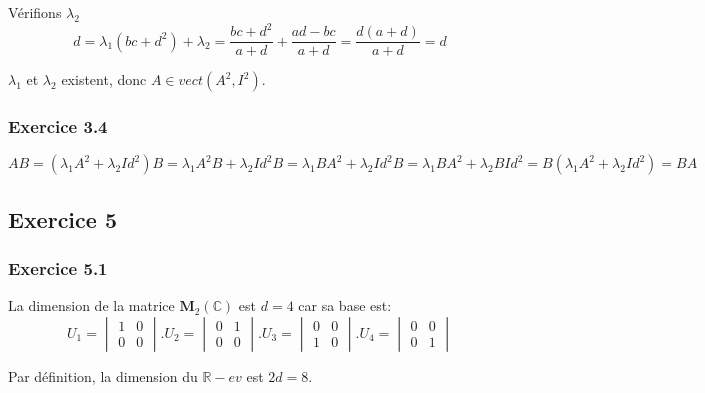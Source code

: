 \documentclass[]{book}
\theoremstyle{definition}
\newcommand{\bb}[1]{\mathbb{#1}}
\newcommand{\R}{\bb{R}}
\newcommand{\C}{\bb{C}}
\newcommand{\M}{\mathbf{M}}
\begin{document}
V\'erifions $\lambda_2$
$$
d = \lambda_1(bc+d^2) + \lambda_2 = \frac{bc+d^2}{a+d} + \frac{ad - bc}{a+d} = \frac{d(a+d)}{a+d} = d
$$

$\lambda_1$ et $\lambda_2$ existent, donc $A \in vect(A^2, I^2)$.

\subsubsection*{Exercice 3.4}
$$
AB = (\lambda_1A^2 + \lambda_2Id^2)B = \lambda_1A^2B + \lambda_2Id^2B = \lambda_1BA^2 + \lambda_2Id^2B = \lambda_1BA^2 + \lambda_2BId^2 = B(\lambda_1A^2 + \lambda_2Id^2) = BA
$$

\subsection*{Exercice 5}
\subsubsection*{Exercice 5.1}
La dimension de la matrice $\M_2(\C)$ est $d=4$ car sa base est:
$$U_1 = \begin{vmatrix} 1 & 0 \\ 0 & 0 \end{vmatrix} . U_2 = \begin{vmatrix} 0 & 1 \\ 0 & 0 \end{vmatrix} . U_3 = \begin{vmatrix} 0 & 0 \\ 1 & 0 \end{vmatrix} . U_4 = \begin{vmatrix} 0 & 0 \\ 0 & 1 \end{vmatrix}$$

Par d\'efinition, la dimension du $\R-ev$ est $2d = 8$.
\end{document}
